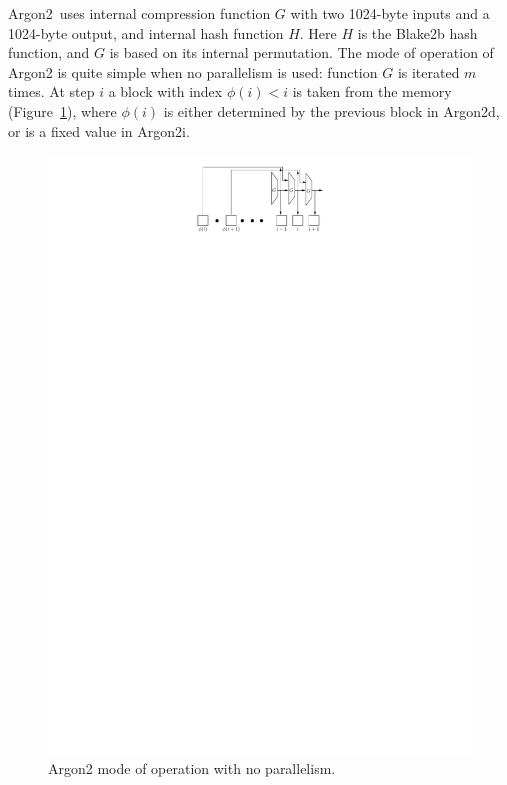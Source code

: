 \documentclass[a4paper]{article}
\begin{document}
\textsf{Argon2}\ uses internal compression function ${G}$ with two 1024-byte inputs and a 1024-byte output, and internal hash function ${H}$. Here ${H}$ is the Blake2b hash function, and ${G}$ is based on  its internal permutation. The mode of operation of \textsf{Argon2} is quite simple when no parallelism is used: function ${G}$ is iterated $m$ times. At step $i$ a block with index $\phi(i)<i$ is taken from the memory (Figure~\ref{fig:generic}), where $\phi(i)$ is either determined by the previous block in \textsf{Argon2d}, or is a fixed value in \textsf{Argon2i}.



\begin{figure}[ht]
  \ifpdf
\begin{center}
  \includegraphics[scale=0.6]{pics/generic.pdf}
  \caption{Argon2 mode of operation with no parallelism. }\label{fig:generic}
\end{center}
\fi
  \end{figure}
\end{document}
